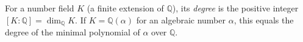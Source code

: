 
For a number field $K$ (a finite extension of $\mathbb Q$), its \emph{degree} is the positive integer $[K:\mathbb Q]=\dim_{\mathbb Q}K$. If $K=\mathbb Q(\alpha)$ for an algebraic number $\alpha$, this equals the degree of the minimal polynomial of $\alpha$ over $\mathbb Q$.

